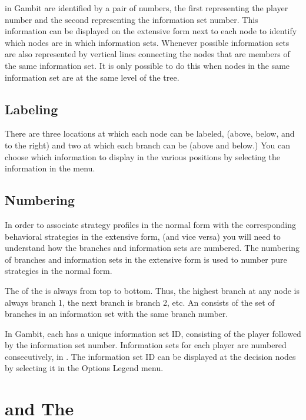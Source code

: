  in Gambit are identified by a 
pair of numbers, the first representing the player number and the 
second representing the information set number.  This information 
can be displayed on the extensive form next to each node to identify 
which nodes are in which information sets.  
Whenever possible information sets are also represented 
by vertical lines connecting the nodes that are members of the same information set.  
It is only possible to do this when nodes 
in the same information set are at the same level of the tree.  

\subsection{Labeling}
There are three locations at which each node can be labeled, (above, 
below, and to the right) and two at which each branch can be 
 (above and below.) You can choose which information to display 
in the various positions by selecting the information in the   menu.  

\subsection{Numbering}\label{infosetnumbering}
In order  to associate strategy profiles in the 
normal form with the corresponding behavioral strategies in the extensive 
form, (and vice versa) you will need to understand how the branches and 
information sets are numbered.  The numbering of branches and information 
sets in the extensive form  is used to number pure strategies in the normal form.  

The  of the  is always
from top to bottom.  Thus, the highest branch at any node is always branch
1, the next branch is branch 2, etc. An  consists of 
the set of branches in an information set with the same branch number.  

In Gambit, each  has a unique 
information set ID, consisting of the player followed by the information 
set number.  Information sets for each player are numbered consecutively, 
in .  
The information set ID can be displayed at the decision nodes by selecting 
it in the Options Legend menu.  

\section{ and The }

